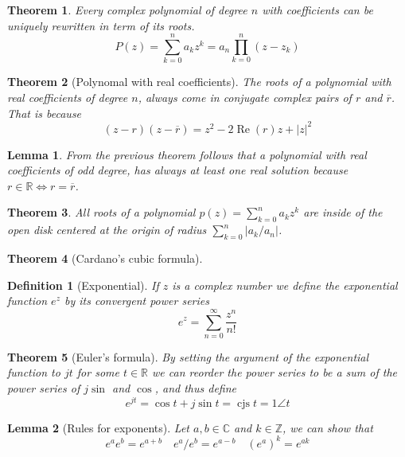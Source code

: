 \documentclass[twocolumn, margin=small]{tex/hsrzf}
\newcommand\Zset{\mathbb{Z}}
\newcommand\Rset{\mathbb{R}}
\newcommand\Cset{\mathbb{C}}
\DeclareMathOperator\cjs{cjs}
\newcommand\conj[1]{\overline{#1}}
\newcommand\len[1]{\lvert#1\rvert}
\renewcommand\Re{\operatorname{Re}}
\theoremstyle{komfourzf}
\newtheorem{theorem}{Theorem}
\newtheorem{definition}{Definition}
\newtheorem{lemma}{Lemma}
\begin{document}
\begin{theorem}
  Every complex polynomial of degree \(n\) with coefficients can be \emph{uniquely} rewritten in term of its roots.
  \[
    P(z) = \sum_{k=0}^n a_k z^k = a_n \prod_{k=0}^{n} (z - z_k)
  \]
\end{theorem}

\begin{theorem}[Polynomal with real coefficients]
  The roots of a polynomial with real coefficients of degree \(n\), always come in conjugate complex pairs of \(r\) and \(\conj{r}\). That is because
  \[
    (z - r)(z - \conj{r}) = z^2 - 2\Re(r)z + \len{z}^2
  \]
\end{theorem}

\begin{lemma}
  From the previous theorem follows that a polynomial with real coefficients of \emph{odd} degree, has \emph{always} at least one real solution because \(r \in\Rset \iff r = \conj{r}\).
\end{lemma}

\begin{theorem}
  All roots of a polynomial \(p(z) = \sum_{k=0}^n a_k z^k\) are inside of the open disk centered at the origin of radius \(\sum_{k=0}^n \len{a_k / a_n}\).
\end{theorem}

\begin{theorem}[Cardano's cubic formula]
\end{theorem}

\begin{definition}[Exponential]
  If \(z\) is a complex number we define the exponential function \(e^z\) by its convergent power series
  \[
    e^z = \sum_{n=0}^\infty \frac{z^n}{n!}
  \]
\end{definition}

\begin{theorem}[Euler's formula]
  By setting the argument of the exponential function to \(jt\) for some \(t \in\Rset\) we can reorder the power series to be a sum of the power series of \(j\sin\) and \(\cos\), and thus define
  \[
    e^{jt} = \cos t + j\sin t = \cjs t = 1\angle t
  \]
\end{theorem}

\begin{lemma}[Rules for exponents]
  Let \(a,b \in\Cset\) and \(k\in\Zset\), we can show that
  \[
    e^a e^b = e^{a+b} \quad
    e^a / e^b = e^{a-b} \quad
    \left(e^a \right)^k = e^{ak}
  \]
\end{lemma}
\end{document}
